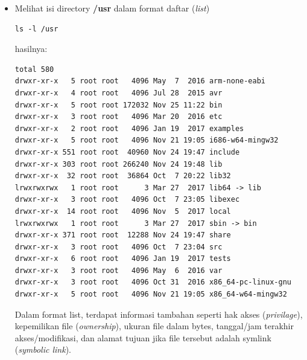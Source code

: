 \documentclass[12pt,]{article}
\begin{document}
\begin{itemize}
\begin{itemize}
			\item Melihat isi directory \textbf{/usr} dalam format daftar (\textit{list})
			\begin{verbatim}
ls -l /usr
			\end{verbatim}
			hasilnya:
			\begin{verbatim}
total 580
drwxr-xr-x   5 root root   4096 May  7  2016 arm-none-eabi
drwxr-xr-x   4 root root   4096 Jul 28  2015 avr
drwxr-xr-x   5 root root 172032 Nov 25 11:22 bin
drwxr-xr-x   3 root root   4096 Mar 20  2016 etc
drwxr-xr-x   2 root root   4096 Jan 19  2017 examples
drwxr-xr-x   5 root root   4096 Nov 21 19:05 i686-w64-mingw32
drwxr-xr-x 551 root root  40960 Nov 24 19:47 include
drwxr-xr-x 303 root root 266240 Nov 24 19:48 lib
drwxr-xr-x  32 root root  36864 Oct  7 20:22 lib32
lrwxrwxrwx   1 root root      3 Mar 27  2017 lib64 -> lib
drwxr-xr-x   3 root root   4096 Oct  7 23:05 libexec
drwxr-xr-x  14 root root   4096 Nov  5  2017 local
lrwxrwxrwx   1 root root      3 Mar 27  2017 sbin -> bin
drwxr-xr-x 371 root root  12288 Nov 24 19:47 share
drwxr-xr-x   3 root root   4096 Oct  7 23:04 src
drwxr-xr-x   6 root root   4096 Jan 19  2017 tests
drwxr-xr-x   3 root root   4096 May  6  2016 var
drwxr-xr-x   3 root root   4096 Oct 31  2016 x86_64-pc-linux-gnu
drwxr-xr-x   5 root root   4096 Nov 21 19:05 x86_64-w64-mingw32
			\end{verbatim}
			Dalam format list, terdapat informasi tambahan seperti hak akses (\textit{privilage}),
			kepemilikan file (\textit{ownership}),
			ukuran file dalam bytes,
			tanggal/jam terakhir akses/modifikasi,
			dan alamat tujuan jika file tersebut adalah symlink (\textit{symbolic link}).


\end{itemize}
\end{itemize}
\end{document}
